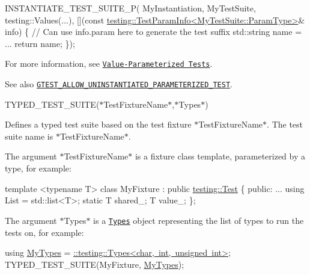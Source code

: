 \begin{DoxyCode}
INSTANTIATE\_TEST\_SUITE\_P(
    MyInstantiation, MyTestSuite,
    testing::Values(...),
    [](\textcolor{keyword}{const} \mbox{\hyperlink{structtesting_1_1TestParamInfo}{testing::TestParamInfo<MyTestSuite::ParamType>}}& 
      info) \{
      \textcolor{comment}{// Can use info.param here to generate the test suffix}
      std::string name = ...
      \textcolor{keywordflow}{return} name;
    \});
\end{DoxyCode}


For more information, see \href{../advanced.md#value-parameterized-tests}{\tt Value-\/\+Parameterized Tests}.

See also \href{#GTEST_ALLOW_UNINSTANTIATED_PARAMETERIZED_TEST}{\tt {\ttfamily G\+T\+E\+S\+T\+\_\+\+A\+L\+L\+O\+W\+\_\+\+U\+N\+I\+N\+S\+T\+A\+N\+T\+I\+A\+T\+E\+D\+\_\+\+P\+A\+R\+A\+M\+E\+T\+E\+R\+I\+Z\+E\+D\+\_\+\+T\+E\+ST}}.

{\ttfamily T\+Y\+P\+E\+D\+\_\+\+T\+E\+S\+T\+\_\+\+S\+U\+I\+TE(}$\ast${\ttfamily Test\+Fixture\+Name}$\ast${\ttfamily ,}$\ast${\ttfamily Types}$\ast${\ttfamily )}

Defines a typed test suite based on the test fixture $\ast${\ttfamily Test\+Fixture\+Name}$\ast$. The test suite name is $\ast${\ttfamily Test\+Fixture\+Name}$\ast$.

The argument $\ast${\ttfamily Test\+Fixture\+Name}$\ast$ is a fixture class template, parameterized by a type, for example\+:


\begin{DoxyCode}
\textcolor{keyword}{template} <\textcolor{keyword}{typename} T>
\textcolor{keyword}{class }MyFixture : \textcolor{keyword}{public} \mbox{\hyperlink{classtesting_1_1Test}{testing::Test}} \{
 \textcolor{keyword}{public}:
  ...
  \textcolor{keyword}{using} List = std::list<T>;
  \textcolor{keyword}{static} T shared\_;
  T value\_;
\};
\end{DoxyCode}


The argument $\ast${\ttfamily Types}$\ast$ is a \href{#Types}{\tt {\ttfamily Types}} object representing the list of types to run the tests on, for example\+:


\begin{DoxyCode}
\textcolor{keyword}{using} \mbox{\hyperlink{structtesting_1_1internal_1_1ProxyTypeList}{MyTypes}} = \mbox{\hyperlink{structtesting_1_1internal_1_1ProxyTypeList}{::testing::Types<char, int, unsigned int>}};
TYPED\_TEST\_SUITE(MyFixture, \mbox{\hyperlink{structtesting_1_1internal_1_1ProxyTypeList}{MyTypes}});
\end{DoxyCode}


